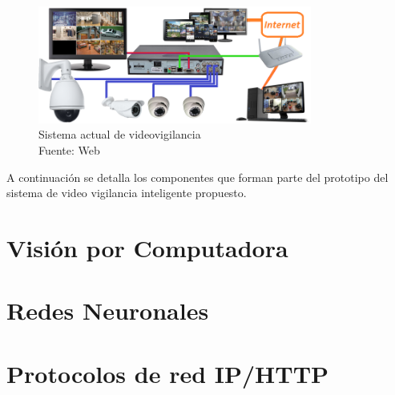 \begin{figure}[H]
    \begin{center}
        \includegraphics[width=9cm]{img/capitulo_2/sis_videovigilancia.png}
    \end{center}
    \caption{Sistema actual de videovigilancia\\Fuente: Web}
    \label{fig:sistema_video_vigilancia}
\end{figure}

A continuación se detalla los componentes que forman parte del prototipo del sistema de video vigilancia inteligente propuesto.






\section{Visión por Computadora}

\section{Redes Neuronales}

\section{Protocolos de red IP/HTTP}

